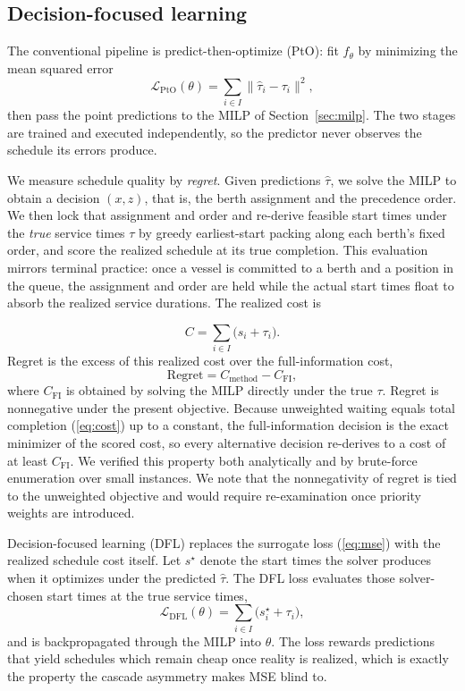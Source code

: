 \subsection{Decision-focused learning}\label{sec:dfl}

The conventional pipeline is predict-then-optimize (PtO): fit $f_\theta$ by
minimizing the mean squared error
\begin{equation}\label{eq:mse}
\mathcal{L}_{\text{PtO}}(\theta) = \sum_{i\in I}\bigl\|\hat\tau_i-\tau_i\bigr\|^2 ,
\end{equation}
then pass the point predictions to the MILP of Section~\ref{sec:milp}. The two
stages are trained and executed independently, so the predictor never observes
the schedule its errors produce.

We measure schedule quality by \emph{regret}. Given predictions $\hat\tau$, we
solve the MILP to obtain a decision $(x,z)$, that is, the berth assignment and
the precedence order. We then lock that assignment and order and re-derive
feasible start times under the \emph{true} service times $\tau$ by greedy
earliest-start packing along each berth's fixed order, and score the realized
schedule at its true completion. This evaluation mirrors terminal practice: once
a vessel is committed to a berth and a position in the queue, the assignment and
order are held while the actual start times float to absorb the realized service
durations. The realized cost is

\begin{equation}\label{eq:cost}
C = \sum_{i\in I}\bigl(s_i+\tau_i\bigr).
\end{equation}
Regret is the excess of this realized cost over the full-information cost,
\begin{equation}\label{eq:regret}
\mathrm{Regret} = C_{\text{method}} - C_{\text{FI}},
\end{equation}
where $C_{\text{FI}}$ is obtained by solving the MILP directly under the true
$\tau$. Regret is nonnegative under the present objective. Because unweighted
waiting equals total completion (\ref{eq:cost}) up to a constant, the
full-information decision is the exact minimizer of the scored cost, so every
alternative decision re-derives to a cost of at least $C_{\text{FI}}$. We
verified this property both analytically and by brute-force enumeration over
small instances. We note that the nonnegativity of regret is tied to the
unweighted objective and would require re-examination once priority weights are
introduced.

Decision-focused learning (DFL) replaces the surrogate loss (\ref{eq:mse}) with
the realized schedule cost itself. Let $s^\star$ denote the start times the solver
produces when it optimizes under the predicted $\hat\tau$. The DFL loss evaluates
those solver-chosen start times at the true service times,
\begin{equation}\label{eq:dfl}
\mathcal{L}_{\text{DFL}}(\theta) = \sum_{i\in I}\bigl(s^\star_i+\tau_i\bigr),
\end{equation}
and is backpropagated through the MILP into $\theta$. The loss rewards
predictions that yield schedules which remain cheap once reality is realized,
which is exactly the property the cascade asymmetry makes MSE blind to.

